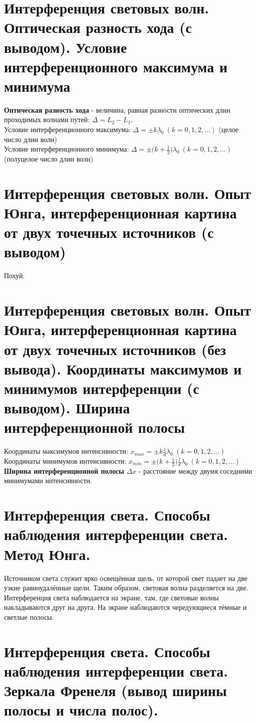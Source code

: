 \documentclass[14pt]{extarticle}
\begin{document}
\section{Интерференция световых волн. Оптическая разность хода (с выводом). 
Условие интерференционного максимума и минимума}
\textbf{Оптическая разность хода} -  величина, равная разности оптических
длин проходимых волнами путей: $\Delta = L_2 - L_1$.\\
Условие интерференционного максимума: $\Delta = \pm k\lambda_0 \
(k = 0, 1, 2, ...)$ (целое число длин волн)\\ 
Условие интерференционного минимума: $\Delta = \pm \bigl(k+\frac{1}{2}\bigr)
\lambda_0 \ (k = 0, 1, 2, ...)$ (полуцелое число длин волн)
\section{Интерференция световых волн. Опыт Юнга, интерференционная картина от двух
точечных источников (с выводом)}
Похуй. 
\section{Интерференция световых волн. Опыт Юнга, интерференционная картина от двух
точечных источников (без вывода). Координаты максимумов и минимумов
интерференции (с выводом). Ширина интерференционной полосы}
Координаты максимумов интенсивности: 
$x_{max} = \pm k \frac{l}{d} \lambda_0 \ (k = 0, 1, 2, ...)$\\
Координаты минимумов интенсивности: 
$x_{min} = \pm \bigl(k+\frac{1}{2}\bigr) \frac{l}{d} \lambda_0 
\ (k = 0, 1, 2, ...)$\\
\textbf{Ширина интерференционной полосы} $\Delta x$ - расстояние между 
двумя соседними минимумами интенсивности.
\section{Интерференция света. Способы наблюдения интерференции света. Метод Юнга.}
Источником света служит ярко освещённая щель, от которой свет падает на две
узкие равноудалённые щели. Таким образом, световая волна разделяется на две. 
Интерференция света наблюдается на экране, там, где световые волны 
накладываются друг на друга. На экране наблюдаются чередующиеся тёмные 
и светлые полосы. 
\section{Интерференция света. Способы наблюдения интерференции света. Зеркала Френеля
(вывод ширины полосы и числа полос).}
\end{document}
